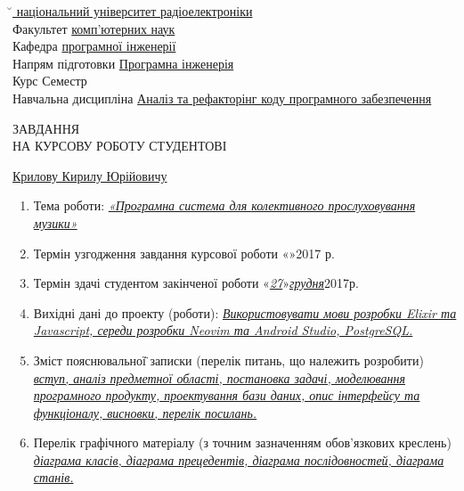 \noindent\uline{̆ національний університет радіоелектроніки\hfill} \\
Факультет \uline{комп’ютерних наук\hfill} \\
Кафедра \uline{програмної інженерії\hfill} \\
Напрям підготовки \uline{Програмна інженерія\hfill} \\
Курс \uline{} Семестр \uline{\hfill} \\
\vspace*{\baselineskip}
Навчальна дисципліна \uline{Аналіз та рефакторінг коду програмного забезпечення}
\vspace*{\baselineskip}
\begin{center}
  ЗАВДАННЯ \\
  НА КУРСОВУ РОБОТУ СТУДЕНТОВІ
\end{center}
\noindent\uline{\hfill Крилову Кирилу Юрійовичу \hfill} \\
\begin{enumerate}
  \item Тема роботи: \uline{\textit{«Програмна система для колективного прослуховування музики»}\hfill}
  \item Термін узгодження завдання курсової роботи «\uline{\hspace{1em}}»\uline{\hfill}2017 р.
  \item Термін здачі студентом закінченої роботи  «\uline{\textit{27}}»\uline{\hfill\textit{грудня}\hfill}2017р.
  \item Вихідні дані до проекту (роботи):
    \textit{\uline{
        Використовувати мови розробки Elixir та Javascript, середи розробки Neovim та Android Studio, PostgreSQL.\hfill
    }}
    \mbox{}
  \item Зміст пояснювальної̈ записки (перелік питань, що належить розробити) \\
    \textit{\uline{
        вступ, аналіз предметної області, постановка задачі, моделювання \hfill\mbox{}\\
        програмного продукту, проектування бази даних, опис інтерфейсу та функціоналу, висновки, перелік посилань.
        \hfill
    }}
    \mbox{}
  \item Перелік графічного матеріалу (з точним зазначенням обов’язкових креслень) \\
    \textit{\uline{
        діаграма класів, діаграма прецедентів, діаграма послідовностей, діаграма станів.
        \hfill
    }}
\end{enumerate}

\newpage
